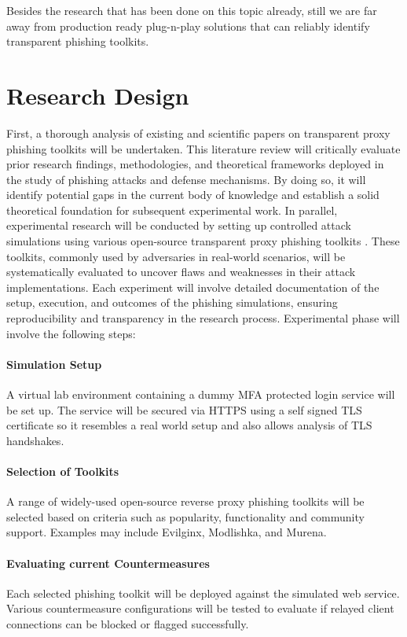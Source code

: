 \documentclass[12pt]{scrbook}
\begin{document}
Besides the research that has been done on this topic already, still we are far away from
production ready plug-n-play solutions that can reliably identify transparent phishing toolkits.

\section{Research Design}
First, a thorough analysis of existing and scientific papers on transparent
proxy
phishing toolkits will be undertaken. This literature review will critically
evaluate prior research findings, methodologies, and theoretical frameworks
deployed in the study of phishing attacks and defense mechanisms. By doing
so, it will identify potential gaps in the current body of knowledge and
establish
a solid theoretical foundation for subsequent experimental work.
In parallel, experimental research will be conducted by setting up controlled
attack simulations using various open-source transparent proxy phishing toolkits
. These toolkits, commonly used by adversaries in real-world scenarios, will
be systematically evaluated to uncover flaws and weaknesses in their attack
implementations. Each experiment will involve detailed documentation of the
setup, execution, and outcomes of the phishing simulations, ensuring reproducibility
and transparency in the research process.  Experimental phase will involve the following steps:

\paragraph{Simulation Setup}
A virtual lab environment containing a dummy MFA protected login service will be set up.
The service will be secured via HTTPS using a self signed TLS certificate so it resembles a real
world setup and also allows analysis of TLS handshakes.

\paragraph{Selection of Toolkits}
A range of widely-used open-source reverse proxy phishing toolkits will be selected
based on criteria such as popularity, functionality and community support.
Examples may include Evilginx, Modlishka, and Murena.

\paragraph{Evaluating current Countermeasures}
Each selected phishing toolkit will be deployed against the simulated web
service. Various countermeasure configurations will be tested to evaluate if relayed
client connections can be blocked or flagged successfully.
\end{document}
